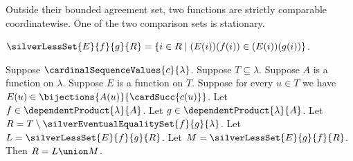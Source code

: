 Outside their bounded agreement set, two functions are strictly comparable
coordinatewise. One of the two comparison sets is stationary.

\begin{definition}\label{silver_less_set}
    $\silverLessSet{E}{f}{g}{R}
        =\{i\in R\mid (E(i))(f(i))\in(E(i))(g(i))\}$.
\end{definition}

\begin{proposition}\label{silver_less_sets_partition_difference}
    Suppose $\cardinalSequenceValues{c}{\lambda}$.
    Suppose $T\subseteq\lambda$.
    Suppose $A$ is a function on $\lambda$.
    Suppose $E$ is a function on $T$.
    Suppose for every $u\in T$ we have
        $E(u)\in\bijections{A(u)}{\cardSucc{c(u)}}$.
    Let $f\in\dependentProduct{\lambda}{A}$.
    Let $g\in\dependentProduct{\lambda}{A}$.
    Let $R=T\setminus\silverEventualEqualitySet{f}{g}{\lambda}$.
    Let $L=\silverLessSet{E}{f}{g}{R}$.
    Let $M=\silverLessSet{E}{g}{f}{R}$.
    Then $R=L\union M$.
\end{proposition}
